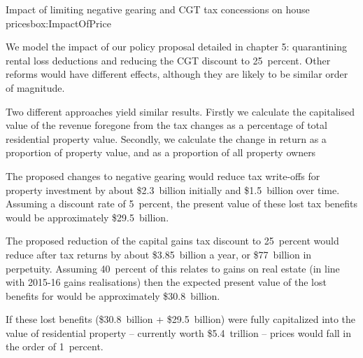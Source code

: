 \documentclass{grattan}\usepackage[]{graphicx}\usepackage[]{color}
\begin{document}
\begin{bigbox*}{Impact of limiting negative gearing {and CGT} tax concessions on house prices}{box:ImpactOfPrice}

We model the impact of our policy proposal detailed in chapter 5: quarantining rental loss deductions and reducing the CGT discount to 25~percent. Other reforms would have different effects, although they are likely to be similar order of magnitude.

Two different approaches yield similar results. Firstly we calculate the capitalised value of the revenue foregone from the tax changes as a percentage of total residential property value. Secondly, we calculate the change in return as a proportion of property value, and as a proportion of all property owners



The proposed changes to negative gearing would reduce tax write-offs for property investment by about \$2.3~billion initially and \$1.5~billion over time. Assuming a discount rate of 
5~percent, the present value of these lost tax benefits would be approximately \$29.5~billion.


The proposed reduction of the capital gains tax discount to 25~percent would reduce after tax returns by about \$3.85~billion a year, or \$77~billion in perpetuity. Assuming 40~percent of this relates to gains on real estate (in line with 2015-16 gains realisations) then the expected present value of the lost benefits for would be approximately \$30.8~billion.



If these lost benefits (\$30.8~billion + \$29.5~billion) were fully capitalized into the value of residential property -- currently worth \$5.4~trillion -- prices would fall in the order of 1~percent.

\eject
{}
\begin{table}[H]
\caption{Impact of policy changes on after-tax returns}\label{tbl:Impact-house-prices}
\end{table}
\end{bigbox*}
\end{document}
